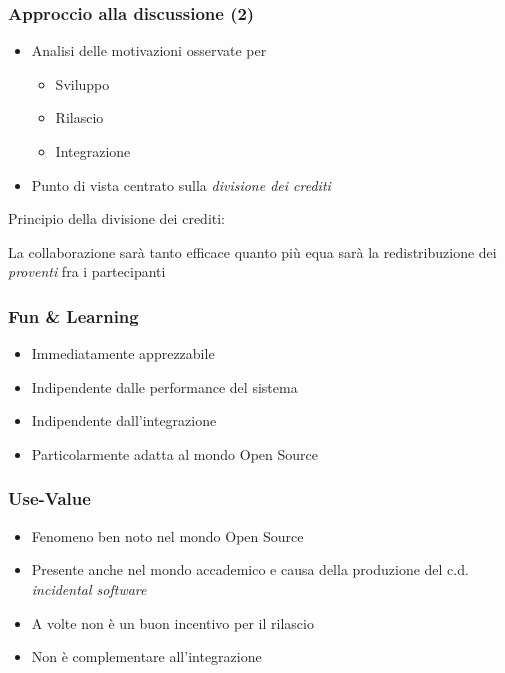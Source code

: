 \begin{frame}\frametitle{Approccio alla discussione (2)}

\begin{itemize}[<+->]
\itemsep1pt\parskip0pt
\item
  Analisi delle motivazioni osservate per

  \begin{itemize}[<+->]
  \itemsep1pt\parskip0pt
  \item
    Sviluppo
  \item
    Rilascio
  \item
    Integrazione
  \end{itemize}
\item
  Punto di vista centrato sulla \alert{\em{divisione dei crediti}}
\end{itemize}

\begin{block}{Principio della divisione dei crediti:}

La collaborazione sarà tanto \alert{efficace} quanto più \alert{equa}
sarà la redistribuzione dei \emph{proventi} fra i partecipanti

\end{block}

\end{frame}

\begin{frame}\frametitle{Fun \& Learning}

\begin{itemize}[<+->]
\itemsep1pt\parskip0pt
\item
  Immediatamente apprezzabile
\item
  Indipendente dalle performance del sistema
\item
  Indipendente dall'integrazione
\item
  Particolarmente adatta al mondo Open Source
\end{itemize}

\end{frame}

\begin{frame}\frametitle{Use-Value}

\begin{itemize}[<+->]
\itemsep1pt\parskip0pt
\item
  Fenomeno ben noto nel mondo Open Source
\item
  Presente anche nel mondo accademico e causa della produzione del c.d.
  \emph{incidental software}
\item
  A volte non è un buon incentivo per il rilascio
\item
  Non è complementare all'integrazione
\end{itemize}

\end{frame}

